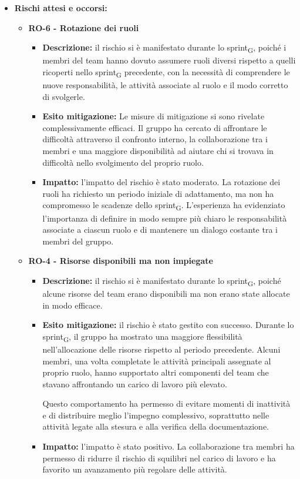 \documentclass[a4paper, 10pt, colorlinks=true, linkcolor=black, urlcolor=blue, citecolor=blue, hidelinks]{article}
\begin{document}
\begin{itemize}
    \item \textbf{Rischi attesi e occorsi:}

    \begin{itemize}
        \item \textbf{RO-6 - Rotazione dei ruoli}
        \begin{itemize}
            \item \textbf{Descrizione:} il rischio si è manifestato durante lo sprint\textsubscript{G}, poiché i membri del team hanno dovuto assumere ruoli diversi rispetto a quelli ricoperti nello sprint\textsubscript{G} precedente, con la necessità di comprendere le nuove responsabilità, le attività associate al ruolo e il modo corretto di svolgerle.

            \item \textbf{Esito mitigazione:} Le misure di mitigazione si sono rivelate complessivamente efficaci. Il gruppo ha cercato di affrontare le difficoltà attraverso il confronto interno, la collaborazione tra i membri e una maggiore disponibilità ad aiutare chi si trovava in difficoltà nello svolgimento del proprio ruolo.

            \item \textbf{Impatto:} l'impatto del rischio è stato moderato. La rotazione dei ruoli ha richiesto un periodo iniziale di adattamento, ma non ha compromesso le scadenze dello sprint\textsubscript{G}. L'esperienza ha evidenziato l'importanza di definire in modo sempre più chiaro le responsabilità associate a ciascun ruolo e di mantenere un dialogo costante tra i membri del gruppo.
        \end{itemize}
        \item \textbf{RO-4 - Risorse disponibili ma non impiegate}
        \begin{itemize}
            \item \textbf{Descrizione:} il rischio si è manifestato durante lo sprint\textsubscript{G}, poiché alcune risorse del team erano disponibili ma non erano state allocate in modo efficace. 
            \item \textbf{Esito mitigazione:} il rischio è stato gestito con successo. Durante lo sprint\textsubscript{G}, il gruppo ha mostrato una maggiore flessibilità nell'allocazione delle risorse rispetto al periodo precedente. Alcuni membri, una volta completate le attività principali assegnate al proprio ruolo, hanno supportato altri componenti del team che stavano affrontando un carico di lavoro più elevato.

            Questo comportamento ha permesso di evitare momenti di inattività e di distribuire meglio l'impegno complessivo, soprattutto nelle attività legate alla stesura e alla verifica della documentazione.

            \item \textbf{Impatto:} l'impatto è stato positivo. La collaborazione tra membri ha permesso di ridurre il rischio di squilibri nel carico di lavoro e ha favorito un avanzamento più regolare delle attività.
        \end{itemize}
    \end{itemize}
\end{itemize}
\end{document}
